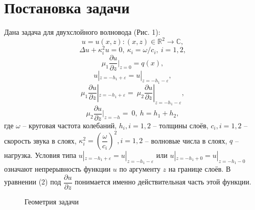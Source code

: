 \documentclass[a4paper, 12pt]{article}
\begin{document}
\tableofcontents

\newpage

\section{Постановка задачи}
Дана задача для двухслойного волновода (Рис. 1):
$$u=u(x,z): (x,z) \in \mathbb{R}^2 \rightarrow \mathbb{C},$$
\begin{equation} 
    \Delta u + \kappa_i^2 u=0,\ \kappa_i=\omega/c_i,\ i=1,2,
\end{equation}
\begin{equation}
    \mu_1 \frac{\partial u}{\partial z}|_{z=0}=q(x),
\end{equation}
\begin{equation}
    u|_{z=-h_1+\varepsilon}=u|_{z=-h_1-\varepsilon},
\end{equation}
\begin{equation}
    \mu_1 \frac{\partial u}{\partial z}|_{z=-h_1+\varepsilon}=\ \mu_2 \frac{\partial u}{\partial z}|_{z=-h_1-\varepsilon},
\end{equation}
\begin{equation}
    \mu_2 \frac{\partial u}{\partial z}|_{z=-h}=\ 0,\ h=h_1+h_2,
\end{equation}
где $\omega$ -- круговая частота колебаний, $h_i, i=1, 2$ -- толщины слоёв, $c_i, i=1, 2$ -- скорость звука в слоях, $\kappa_i^2=\left(\dfrac{\omega}{c_i} \right)^2, i=1, 2$ -- волновые числа в слоях, $q$ -- нагрузка. Условия типа $ u|_{z=-h_1+\varepsilon}=u|_{z=-h_1-\varepsilon}$ или $ u|_{z=-h_1+0}=u|_{z=-h_1-0}$ означают непрерывность функции $u$ по аргументу $z$ на границе слоёв. В уравнении (2) под $\dfrac{\partial u}{\partial z}$ понимается именно действительная часть этой функции.
\begin{figure}[h!]
\noindent{}
\caption{Геометрия задачи}
\label{figCurves}
\end{figure} 
\end{document}
